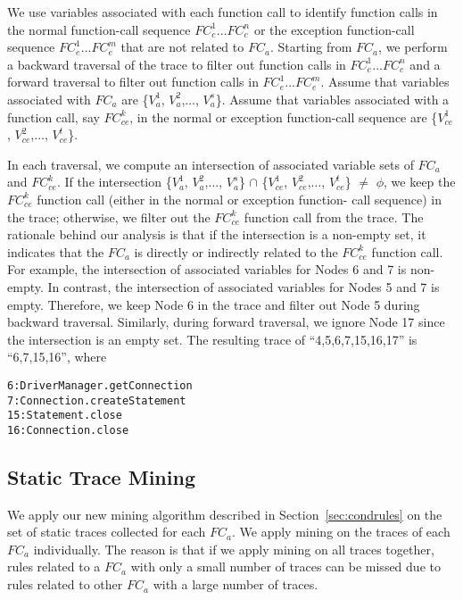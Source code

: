 We use variables associated with each function call to 
identify function calls in the normal function-call sequence $FC_c^1$...$FC_c^n$ or 
the exception function-call sequence $FC_e^1$...$FC_e^m$
that are not related to $FC_a$. 
Starting from $FC_a$, we perform a backward traversal of the trace to filter out function calls
in $FC_c^1$...$FC_c^n$ and a forward traversal to filter out function calls
in $FC_e^1$...$FC_e^m$. 
Assume that variables associated with $FC_a$
are \{$V_a^1$, $V_a^2$,$\ldots$, $V_a^s$\}. Assume that variables associated
with a function call, say $FC_{ce}^k$, in the normal or exception function-call
sequence are \{$V_{ce}^1$, $V_{ce}^2$,$\ldots$, $V_{ce}^t$\}.

In each traversal, we compute an intersection of associated variable sets
of $FC_a$ and $FC_{ce}^k$. If the intersection \{$V_a^1$, $V_a^2$,$\ldots$, $V_a^s$\} $\cap$
\{$V_{ce}^1$, $V_{ce}^2$,$\ldots$, $V_{ce}^t$\} $\neq$ $\phi$, 
we keep the $FC_{ce}^k$ function call (either in the normal or exception function-
call sequence) in the trace; otherwise, we filter out the $FC_{ce}^k$ function call
from the trace. The rationale behind our analysis is that if the intersection
is a non-empty set, it indicates that the $FC_a$ 
is directly or indirectly related to the $FC_{ce}^k$ function call. For example,
the intersection of associated variables for Nodes 6 and 7 is non-empty.
In contrast, the intersection of associated variables for Nodes 5 and 7 is 
empty. Therefore, we keep Node 6 in the trace and filter out Node 5 during backward traversal.
Similarly, during forward traversal, we ignore Node 17 
since the intersection is an empty set. The resulting trace
of ``4,5,6,7,15,16,17'' is ``6,7,15,16'', where

\begin{CodeOut}
\begin{alltt}
\hspace*{0.2in}6 : DriverManager.getConnection
\hspace*{0.2in}7 : Connection.createStatement 
\hspace*{0.2in}15 : Statement.close
\hspace*{0.2in}16 : Connection.close
\end{alltt}
\end{CodeOut}

\subsection{Static Trace Mining}
\vspace*{-2ex}
We apply our new mining algorithm described in Section~\ref{sec:condrules} on the set of 
static traces collected for each $FC_a$. We apply mining on the
traces of each $FC_a$ individually. The reason is that if we apply
mining on all traces together, rules related to a $FC_a$
with only a small number of traces can be missed due to rules related to other $FC_a$
with a large number of traces. 

